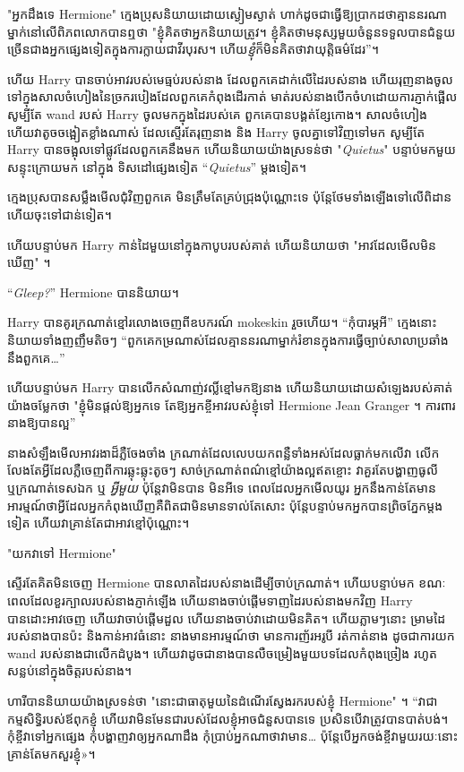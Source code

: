 {{"អ្នកដឹងទេ Hermione" ក្មេងប្រុសនិយាយដោយស្ងៀមស្ងាត់ ហាក់ដូចជាធ្វើឱ្យប្រាកដថាគ្មាននរណាម្នាក់នៅលើពិភពលោកបានឮថា "ខ្ញុំគិតថាអ្នកនិយាយត្រូវ។ ខ្ញុំគិតថាមនុស្សមួយចំនួនទទួលបានជំនួយច្រើនជាងអ្នកផ្សេងទៀតក្នុងការក្លាយជាវីរបុរស។ ហើយ\emph{ខ្ញុំ}ក៏មិនគិតថាវាយុត្តិធម៌ដែរ”។

ហើយ Harry បានចាប់អាវរបស់មេធ្មប់របស់នាង ដែលពួកគេដាក់លើដៃរបស់នាង ហើយរុញនាងចូលទៅក្នុងសាលចំហៀងនៃច្រករបៀងដែលពួកគេកំពុងដើរកាត់ មាត់របស់នាងបើកចំហដោយការភ្ញាក់ផ្អើល សូម្បីតែ wand របស់ Harry ចូលមកក្នុងដៃរបស់គេ ពួកគេបានបង្គត់ខ្សែកោង។ សាលចំហៀង ហើយវាតូចចង្អៀតខ្លាំងណាស់ ដែលស្ទើរតែរុញនាង និង Harry ចូលគ្នាទៅវិញទៅមក សូម្បីតែ Harry បានចង្អុលទៅផ្លូវដែលពួកគេនឹងមក ហើយនិយាយយ៉ាងស្រទន់ថា "\emph{Quietus}" បន្ទាប់មកមួយសន្ទុះក្រោយមក នៅក្នុង ទិសដៅផ្សេងទៀត “\emph{Quietus}” ម្តងទៀត។

ក្មេង​ប្រុស​បាន​សម្លឹង​មើល​ជុំវិញ​ពួក​គេ មិន​ត្រឹម​តែ​គ្រប់​ជ្រុង​ប៉ុណ្ណោះ​ទេ ប៉ុន្តែ​ថែម​ទាំង​ឡើង​ទៅ​លើ​ពិដាន ហើយ​ចុះ​ទៅ​ជាន់​ទៀត។

ហើយបន្ទាប់មក Harry កាន់ដៃមួយនៅក្នុងកាបូបរបស់គាត់ ហើយនិយាយថា "អាវដែលមើលមិនឃើញ" ។

“\emph{Gleep?}” Hermione បាននិយាយ។

Harry បាន​គូរ​ក្រណាត់​ខ្មៅ​រលោង​ចេញ​ពី​ឧបករណ៍​ mokeskin រួច​ហើយ។ “កុំបារម្ភអី” ក្មេងនោះនិយាយទាំងញញឹមតិចៗ “ពួកគេកម្រណាស់ដែលគ្មាននរណាម្នាក់រំខានក្នុងការធ្វើច្បាប់សាលាប្រឆាំងនឹងពួកគេ…”

ហើយបន្ទាប់មក Harry បានលើកសំណាញ់វល្លិ៍ខ្មៅមកឱ្យនាង ហើយនិយាយដោយសំឡេងរបស់គាត់យ៉ាងចម្លែកថា "ខ្ញុំមិនផ្តល់ឱ្យអ្នកទេ តែឱ្យអ្នកខ្ចីអាវរបស់ខ្ញុំទៅ Hermione Jean Granger ។ ការពារនាងឱ្យបានល្អ”

នាងសំឡឹងមើលអាវរងាដ៏ភ្លឺចែងចាំង ក្រណាត់ដែលលេបយកពន្លឺទាំងអស់ដែលធ្លាក់មកលើវា លើកលែងតែអ្វីដែលភ្លឺចេញពីការឆ្លុះឆ្លុះតូចៗ សាច់ក្រណាត់ពណ៌ខ្មៅយ៉ាងល្អឥតខ្ចោះ វាគួរតែបង្ហាញធូលី ឬក្រណាត់ទេសឯក ឬ \emph{អ្វីមួយ} ប៉ុន្តែវាមិនបាន មិនអីទេ ពេលដែលអ្នកមើលយូរ អ្នកនឹងកាន់តែមានអារម្មណ៍ថាអ្វីដែលអ្នកកំពុងឃើញគឺពិតជាមិនមានទាល់តែសោះ ប៉ុន្តែបន្ទាប់មកអ្នកបានព្រិចភ្នែកម្ដងទៀត ហើយវាគ្រាន់តែជាអាវខ្មៅប៉ុណ្ណោះ។

"យកវាទៅ Hermione"

ស្ទើរតែគិតមិនចេញ Hermione បានលាតដៃរបស់នាងដើម្បីចាប់ក្រណាត់។ ហើយបន្ទាប់មក ខណៈពេលដែលខួរក្បាលរបស់នាងភ្ញាក់ឡើង ហើយនាងចាប់ផ្តើមទាញដៃរបស់នាងមកវិញ Harry បានដោះអាវចេញ ហើយវាចាប់ផ្តើមដួល ហើយនាងចាប់វាដោយមិនគិត។ ហើយភ្លាមៗនោះ ម្រាមដៃរបស់នាងបានប៉ះ និងកាន់អាវធំនោះ នាងមានអារម្មណ៍ថា មានការញ័រអរូបី រត់កាត់នាង ដូចជាការយក wand របស់នាងជាលើកដំបូង។ ហើយវាដូចជានាងបានលឺចម្រៀងមួយបទដែលកំពុងច្រៀង រហូតសន្លប់នៅក្នុងចិត្តរបស់នាង។

ហារីបាននិយាយយ៉ាងស្រទន់ថា "នោះជាធាតុមួយនៃដំណើរស្វែងរករបស់ខ្ញុំ Hermione" ។ “វាជាកម្មសិទ្ធិរបស់ឪពុកខ្ញុំ ហើយវាមិនមែនជារបស់ដែលខ្ញុំអាចជំនួសបានទេ ប្រសិនបើវាត្រូវបានបាត់បង់។ កុំ​ខ្ចី​វា​ទៅ​អ្នក​ផ្សេង កុំ​បង្ហាញ​វា​ឲ្យ​អ្នក​ណា​ដឹង កុំ​ប្រាប់​អ្នក​ណា​ថា​វា​មាន​… ប៉ុន្តែ​បើ​អ្នក​ចង់​ខ្ចី​វា​មួយ​រយៈ​នោះ គ្រាន់​តែ​មក​សួរ​ខ្ញុំ»។

}}
